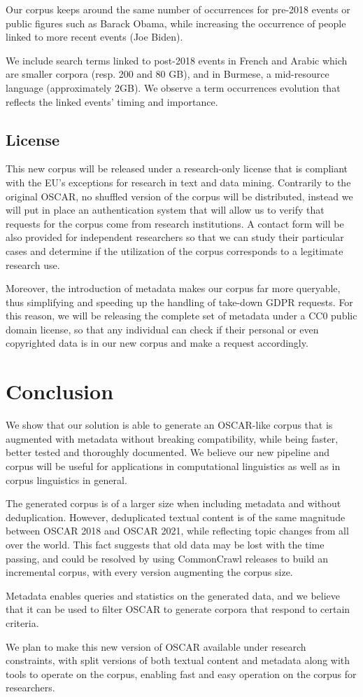 Our corpus keeps around the same number of occurrences for pre-2018 events or public figures such as Barack Obama, while increasing the occurrence of people linked to more recent events (Joe Biden).

We include search terms linked to post-2018 events in French and Arabic which are smaller corpora (resp. 200 and 80 GB), and in Burmese, a mid-resource language (approximately 2GB). We observe a term occurrences evolution that reflects the linked events' timing and importance.

\subsection{License}

This new corpus will be released under a research-only license that is compliant with the EU's exceptions for research in text and data mining. Contrarily to the original OSCAR, no shuffled version of the corpus will be distributed, instead we will put in place an authentication system that will allow us to verify that requests for the corpus come from research institutions. A contact form will be also provided for independent researchers so that we can study their particular cases and determine if the utilization of the corpus corresponds to a legitimate research use.

Moreover, the introduction of metadata makes our corpus far more queryable, thus simplifying and speeding up the handling of take-down GDPR requests. For this reason, we will be releasing the complete set of metadata under a CC0 public domain license, so that any individual can check if their personal or even copyrighted data is in our new corpus and make a request accordingly.

\section{Conclusion}

We show that our solution is able to generate an OSCAR-like corpus that is augmented with metadata without breaking compatibility, while being faster, better tested and thoroughly documented. We believe our new pipeline and corpus will be useful for applications in computational linguistics as well as in corpus linguistics in general.

The generated corpus is of a larger size when including metadata and without deduplication. However, deduplicated textual content is of the same magnitude between OSCAR 2018 and OSCAR 2021, while reflecting topic changes from all over the world. This fact suggests that old data may be lost with the time passing, and could be resolved by using CommonCrawl releases to build an incremental corpus, with every version augmenting the corpus size.

Metadata enables queries and statistics on the generated data, and we believe that it can be used to filter OSCAR to generate corpora that respond to certain criteria.

We plan to make this new version of OSCAR available under research constraints, with split versions of both textual content and metadata along with tools to operate on the corpus, enabling fast and easy operation on the corpus for researchers.